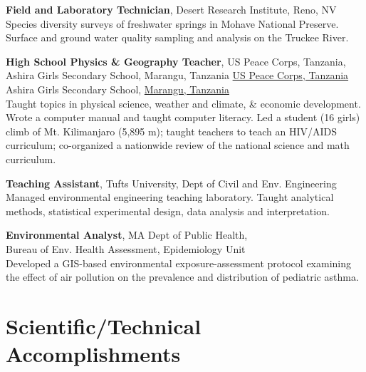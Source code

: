 \documentclass[11pt]{article}
\begin{document}
\begin{description}[style=multiline,leftmargin=2.5cm,font=\normalfont]
\item[2003] \textbf{Field and Laboratory Technician},
	{Desert Research Institute}, Reno, NV
	Species diversity surveys of freshwater springs in Mohave National Preserve. \\
	Surface and ground water quality sampling and analysis on the Truckee River.

\item[2000--2002] \textbf{High School Physics \& Geography Teacher},
	{US Peace Corps, Tanzania}, Ashira Girls Secondary School, {Marangu, Tanzania}
	\href{http://www.peacecorps.gov/index.cfm?shell=learn.wherepc.africa.tanzania}
	{US Peace Corps, Tanzania}\\
	Ashira Girls Secondary School,
	\href{http://g.co/maps/nmzu7}{Marangu, Tanzania}\\
	Taught topics in physical science, weather and climate, \& economic development.
	Wrote a computer manual and taught computer literacy.
	Led a student (16 girls) climb of Mt. Kilimanjaro (5,895 m);
	taught teachers to teach an HIV/AIDS curriculum;
	co-organized a nationwide review of
	the national science and math curriculum.

\item[1998--2000] \textbf{Teaching Assistant}, Tufts University,
	Dept of Civil and Env. Engineering
	Managed environmental engineering teaching laboratory.
	Taught analytical methods, statistical experimental design,
	data analysis and interpretation.


\item[1999] \textbf{Environmental Analyst},
	MA Dept of Public Health,\\ Bureau of Env. Health Assessment, Epidemiology Unit\\
	Developed a GIS-based environmental exposure-assessment protocol
	examining the effect of air pollution on the
	prevalence and distribution of pediatric asthma.

\end{description}


\section{Scientific/Technical Accomplishments}
\end{document}
